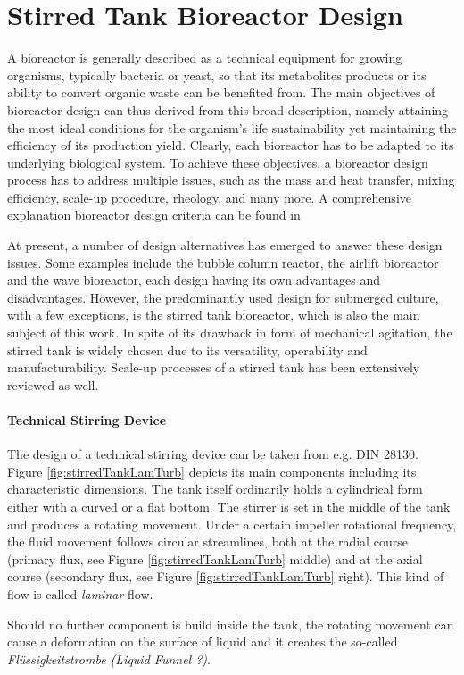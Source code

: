 \section{Stirred Tank Bioreactor Design}

A bioreactor is generally described as a technical equipment for growing organisms, typically bacteria or yeast, so that its metabolites products or its ability to convert organic waste can be benefited from. The main objectives of bioreactor design can thus derived from this broad description, namely attaining the most ideal conditions for the organism's life sustainability yet maintaining the efficiency of its production yield. Clearly, each bioreactor has to be adapted to its underlying biological system. To achieve these objectives, a bioreactor design process has to address multiple issues, such as the mass and heat transfer, mixing efficiency, scale-up procedure, rheology, and many more. A comprehensive explanation bioreactor design criteria can be found in \citet{Mandenius2016}

At present, a number of design alternatives has emerged to answer these design issues. Some examples include the bubble column reactor, the airlift bioreactor and the wave bioreactor, each design having its own advantages and disadvantages. However, the predominantly used design for submerged culture, with a few exceptions, is the stirred tank bioreactor, which is also the main subject of this work. In spite of its drawback in form of mechanical agitation, the stirred tank is widely chosen due to its versatility, operability and manufacturability. Scale-up processes of a stirred tank has been extensively reviewed as well.


\paragraph{Technical Stirring Device}
The design of a technical stirring device can be taken from e.g. DIN 28130. Figure \ref{fig:stirredTankLamTurb} depicts its main components including its characteristic dimensions. The tank itself ordinarily holds a cylindrical form either with a curved or a flat bottom. The stirrer is set in the middle of the tank and produces a rotating movement. Under a certain impeller rotational frequency, the fluid movement follows circular streamlines, both at the radial course (primary flux, see Figure \ref{fig:stirredTankLamTurb} middle) and at the axial course (secondary flux, see Figure \ref{fig:stirredTankLamTurb} right). This kind of flow is called \textit{laminar} flow.

Should no further component is build inside the tank, the rotating movement can cause a deformation on the surface of liquid and it creates the so-called \textit{Fl\"ussigkeitstrombe (Liquid Funnel ?)}.